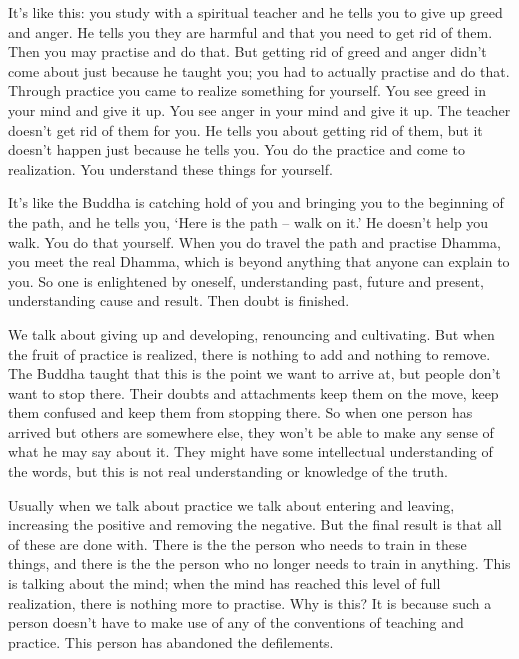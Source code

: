 It's like this: you study with a spiritual teacher and he tells you to give up greed and anger. He tells you they are harmful and that you need to get rid of them. Then you may practise and do that. But getting rid of greed and anger didn't come about just because he taught you; you had to actually practise and do that. Through practice you came to realize something for yourself. You see greed in your mind and give it up. You see anger in your mind and give it up. The teacher doesn't get rid of them for you. He tells you about getting rid of them, but it doesn't happen just because he tells you. You do the practice and come to realization. You understand these things for yourself. 

It's like the Buddha is catching hold of you and bringing you to the beginning of the path, and he tells you, `Here is the path -- walk on it.' He doesn't help you walk. You do that yourself. When you do travel the path and practise Dhamma, you meet the real Dhamma, which is beyond anything that anyone can explain to you. So one is enlightened by oneself, understanding past, future and present, understanding cause and result. Then doubt is finished. 

We talk about giving up and developing, renouncing and cultivating. But when the fruit of practice is realized, there is nothing to add and nothing to remove. The Buddha taught that this is the point we want to arrive at, but people don't want to stop there. Their doubts and attachments keep them on the move, keep them confused and keep them from stopping there. So when one person has arrived but others are somewhere else, they won't be able to make any sense of what he may say about it. They might have some intellectual understanding of the words, but this is not real understanding or knowledge of the truth. 

Usually when we talk about practice we talk about entering and leaving, increasing the positive and removing the negative. But the final result is that all of these are done with. There is the  the person who needs to train in these things, and there is the  the person who no longer needs to train in anything. This is talking about the mind; when the mind has reached this level of full realization, there is nothing more to practise. Why is this? It is because such a person doesn't have to make use of any of the conventions of teaching and practice. This person has abandoned the defilements.

